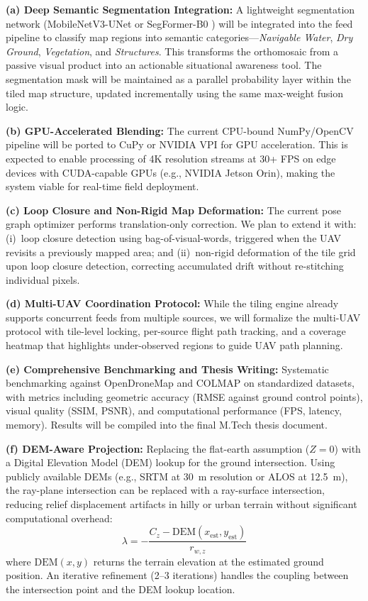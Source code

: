 \documentclass[conference]{IEEEtran}
\begin{document}
\textbf{(a) Deep Semantic Segmentation Integration:} A lightweight segmentation network (MobileNetV3-UNet or SegFormer-B0 \cite{segformer}) will be integrated into the feed pipeline to classify map regions into semantic categories---\textit{Navigable Water}, \textit{Dry Ground}, \textit{Vegetation}, and \textit{Structures}. This transforms the orthomosaic from a passive visual product into an actionable situational awareness tool. The segmentation mask will be maintained as a parallel probability layer within the tiled map structure, updated incrementally using the same max-weight fusion logic.

\textbf{(b) GPU-Accelerated Blending:} The current CPU-bound NumPy/OpenCV pipeline will be ported to CuPy or NVIDIA VPI for GPU acceleration. This is expected to enable processing of 4K resolution streams at 30+ FPS on edge devices with CUDA-capable GPUs (e.g., NVIDIA Jetson Orin), making the system viable for real-time field deployment.

\textbf{(c) Loop Closure and Non-Rigid Map Deformation:} The current pose graph optimizer performs translation-only correction. We plan to extend it with: (i)~loop closure detection using bag-of-visual-words, triggered when the UAV revisits a previously mapped area; and (ii)~non-rigid deformation of the tile grid upon loop closure detection, correcting accumulated drift without re-stitching individual pixels.

\textbf{(d) Multi-UAV Coordination Protocol:} While the tiling engine already supports concurrent feeds from multiple sources, we will formalize the multi-UAV protocol with tile-level locking, per-source flight path tracking, and a coverage heatmap that highlights under-observed regions to guide UAV path planning.

\textbf{(e) Comprehensive Benchmarking and Thesis Writing:} Systematic benchmarking against OpenDroneMap \cite{odm} and COLMAP \cite{colmap} on standardized datasets, with metrics including geometric accuracy (RMSE against ground control points), visual quality (SSIM, PSNR), and computational performance (FPS, latency, memory). Results will be compiled into the final M.Tech thesis document.

\textbf{(f) DEM-Aware Projection:} Replacing the flat-earth assumption ($Z=0$) with a Digital Elevation Model (DEM) lookup for the ground intersection. Using publicly available DEMs (e.g., SRTM at 30~m resolution or ALOS at 12.5~m), the ray-plane intersection can be replaced with a ray-surface intersection, reducing relief displacement artifacts in hilly or urban terrain without significant computational overhead:
\begin{equation}
\lambda = -\frac{C_z - \text{DEM}(x_{\text{est}}, y_{\text{est}})}{r_{w,z}}
\end{equation}
where $\text{DEM}(x, y)$ returns the terrain elevation at the estimated ground position. An iterative refinement (2--3 iterations) handles the coupling between the intersection point and the DEM lookup location.
\end{document}
